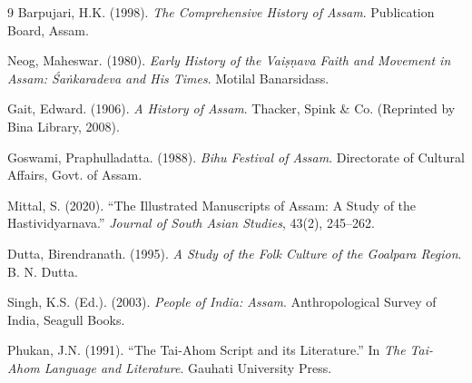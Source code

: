 \documentclass{article}
\begin{document}
\begin{thebibliography}{9}
     Barpujari, H.K. (1998). \textit{The Comprehensive History of Assam}. Publication Board, Assam.

     Neog, Maheswar. (1980). \textit{Early History of the Vaiṣṇava Faith and Movement in Assam: Śaṅkaradeva and His Times}. Motilal Banarsidass.

     Gait, Edward. (1906). \textit{A History of Assam}. Thacker, Spink \& Co. (Reprinted by Bina Library, 2008).

     Goswami, Praphulladatta. (1988). \textit{Bihu Festival of Assam}. Directorate of Cultural Affairs, Govt. of Assam.

     Mittal, S. (2020). “The Illustrated Manuscripts of Assam: A Study of the Hastividyarnava.” \textit{Journal of South Asian Studies}, 43(2), 245–262.

     Dutta, Birendranath. (1995). \textit{A Study of the Folk Culture of the Goalpara Region}. B. N. Dutta.

     Singh, K.S. (Ed.). (2003). \textit{People of India: Assam}. Anthropological Survey of India, Seagull Books.

     Phukan, J.N. (1991). “The Tai-Ahom Script and its Literature.” In \textit{The Tai-Ahom Language and Literature}. Gauhati University Press.
\end{thebibliography}
\end{document}
